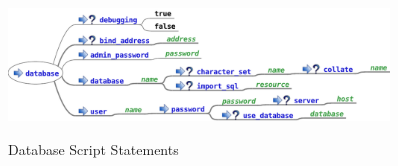 \begin{figure}[htp]
\centering
\includegraphics[width=0.9\textwidth]{database_service_script}
\label{fig:database_script_statements}
\caption{Database Script Statements}
\end{figure}
